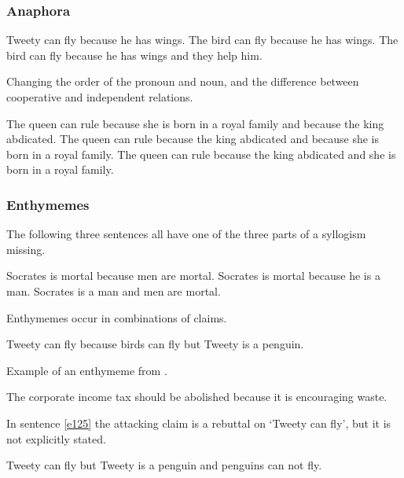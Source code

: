 \subsubsection{Anaphora}
\begin{exe}
\ex\label{e59} Tweety can fly because he has wings.
\ex\label{e60} The bird can fly because he has wings.
\ex\label{e61} The bird can fly because he has wings and they help him.
\end{exe}

\noindent Changing the order of the pronoun and noun, and the difference between cooperative and independent relations.
\begin{exe}
\ex\label{e62} The queen can rule because she is born in a royal family and because the king abdicated.
\ex\label{e63} The queen can rule because the king abdicated and because she is born in a royal family.
\ex\label{e71} The queen can rule because the king abdicated and she is born in a royal family.
\end{exe}

\subsubsection{Enthymemes}
The following three sentences all have one of the three parts of a syllogism missing.
\begin{exe}
\ex\label{e120} Socrates is mortal because men are mortal.
\ex\label{e121} Socrates is mortal because he is a man.
\ex\label{e122} Socrates is a man and men are mortal.
\end{exe}

\noindent Enthymemes occur in combinations of claims.
\begin{exe}
\ex\label{e123} Tweety can fly because birds can fly but Tweety is a penguin.
\end{exe}

\noindent Example of an enthymeme from \citet{Walton:2005dc}.
\begin{exe}
\ex\label{e124} The corporate income tax should be abolished because it is encouraging waste.
\end{exe}

\noindent In sentence \ref{e125} the attacking claim is a rebuttal on `Tweety can fly', but it is not explicitly stated.
\begin{exe}
\ex\label{e125} Tweety can fly but Tweety is a penguin and penguins can not fly.
\end{exe}

